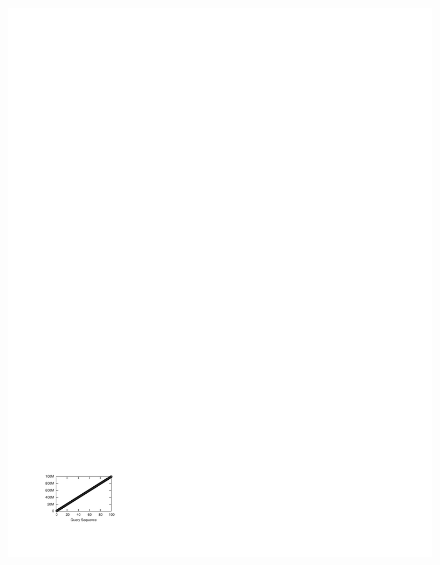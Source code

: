 \begin{figure}[t]
\begin{center}
{            \includegraphics[trim=2cm 2cm 16.3cm 24cm]{Figures/holistic/sequential_predicates}
        }%
       \subfloat[SkyServer]{%
            \label{fig:sequential_pred}
}
\end{center}
\end{figure}
